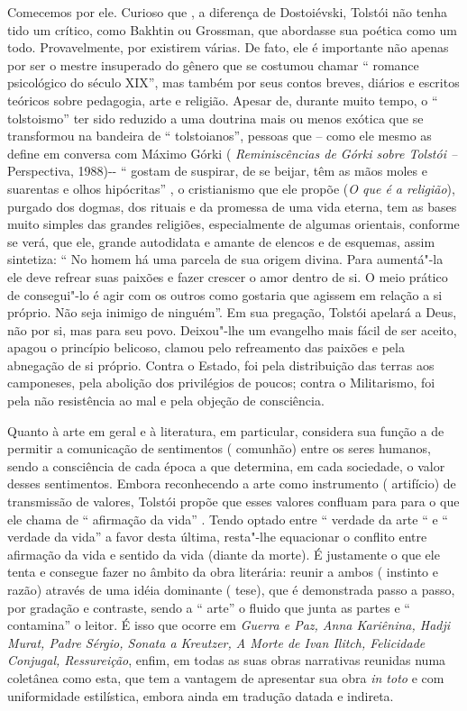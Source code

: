 Comecemos por ele. Curioso que , a diferença de Dostoiévski, Tolstói não
tenha tido um crítico, como Bakhtin ou Grossman, que abordasse sua
poética como um todo. Provavelmente, por existirem várias. De fato, ele
é importante não apenas por ser o mestre insuperado do gênero que se
costumou chamar `` romance psicológico do século XIX'', mas também por
seus contos breves, diários e escritos teóricos sobre pedagogia, arte e
religião. Apesar de, durante muito tempo, o `` tolstoismo'' ter sido
reduzido a uma doutrina mais ou menos exótica que se transformou na
bandeira de `` tolstoianos'', pessoas que -- como ele mesmo as define em
conversa com Máximo Górki ( \emph{Reminiscências de Górki sobre Tolstói
--} Perspectiva, 1988)-\/- `` gostam de suspirar, de se beijar, têm as
mãos moles e suarentas e olhos hipócritas'' , o cristianismo que ele
propõe (\emph{O que é a religião}), purgado dos dogmas, dos rituais e da
promessa de uma vida eterna, tem as bases muito simples das grandes
religiões, especialmente de algumas orientais, conforme se verá, que
ele, grande autodidata e amante de elencos e de esquemas, assim
sintetiza: `` No homem há uma parcela de sua origem divina. Para
aumentá"-la ele deve refrear suas paixões e fazer crescer o amor dentro
de si. O meio prático de consegui"-lo é agir com os outros como gostaria
que agissem em relação a si próprio. Não seja inimigo de ninguém''. Em
sua pregação, Tolstói apelará a Deus, não por si, mas para seu povo.
Deixou"-lhe um evangelho mais fácil de ser aceito, apagou o princípio
belicoso, clamou pelo refreamento das paixões e pela abnegação de si
próprio. Contra o Estado, foi pela distribuição das terras aos
camponeses, pela abolição dos privilégios de poucos; contra o
Militarismo, foi pela não resistência ao mal e pela objeção de
consciência.

Quanto à arte em geral e à literatura, em particular, considera sua
função a de permitir a comunicação de sentimentos ( comunhão) entre os
seres humanos, sendo a consciência de cada época a que determina, em
cada sociedade, o valor desses sentimentos. Embora reconhecendo a arte
como instrumento ( artifício) de transmissão de valores, Tolstói propõe
que esses valores confluam para para o que ele chama de `` afirmação da
vida'' . Tendo optado entre `` verdade da arte `` e `` verdade da vida''
a favor desta última, resta"-lhe equacionar o conflito entre afirmação da
vida e sentido da vida (diante da morte). É justamente o que ele tenta e
consegue fazer no âmbito da obra literária: reunir a ambos ( instinto e
razão) através de uma idéia dominante ( tese), que é demonstrada passo a
passo, por gradação e contraste, sendo a `` arte'' o fluido que junta as
partes e `` contamina'' o leitor. É isso que ocorre em \emph{Guerra e
Paz, Anna Kariênina, Hadji Murat, Padre Sérgio, Sonata a Kreutzer, A
Morte de Ivan Ilitch, Felicidade Conjugal, Ressureição}, enfim, em todas
as suas obras narrativas reunidas numa coletânea como esta, que tem a
vantagem de apresentar sua obra \emph{in toto} e com uniformidade
estilística, embora ainda em tradução datada e indireta.

